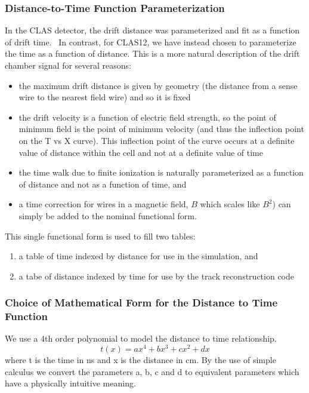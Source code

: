 \subsubsection{Distance-to-Time Function Parameterization}
\label{funcpar} 

In the CLAS detector, the drift distance was parameterized and fit as a function
of drift time.~\cite{mdm95}
In contrast, for CLAS12, we have instead chosen to parameterize the time as a function of
distance.  This is a more natural description of the drift chamber signal
for several reasons:
\begin{itemize}
\item the maximum drift distance is given by geometry (the distance from
a sense wire to the nearest field wire) and so it is fixed
\item the drift velocity is a function of electric field strength, so the
point of minimum field is the point of minimum velocity (and thus the inflection point on the T vs X curve). 
This inflection point of the curve occurs at a
definite value of distance within the cell and not at a definite value of time
\item the time walk due to finite ionization is
naturally parameterized as a function of distance and not as a function of time, and
\item  a time correction for wires in a magnetic field, $B$ which
scales like $B^2$) can simply be added to the nominal functional form.
\end{itemize}

This single functional form is used to fill two tables: 
\begin{enumerate}
\item a table of time indexed by distance for use in the simulation, and 
\item a tabe of distance indexed by time for use by the track reconstruction code
\end{enumerate}


\subsubsection{Choice of Mathematical Form for the Distance to Time Function}
We use a 4th order polynomial to model the distance to time relationship.
\begin{equation}
t(x) =  a x^4 + b x^3 + c x^2 + d x
\end{equation}
where t is the time in ns and x is the distance in cm.
By the use of simple calculus we convert the parameters a, b, c and d to equivalent 
parameters which have
a physically intuitive meaning.

